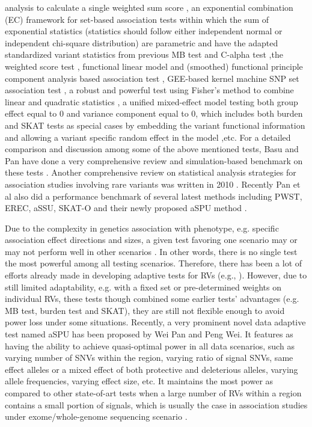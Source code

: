 \documentclass[12pt]{article}
\begin{document}
analysis to calculate a single weighted sum score \cite{Zhang2011}, an exponential combination (EC) framework for set-based association tests within which the sum of exponential statistics (statistics should follow either independent normal or independent chi-square distribution) are parametric and have the adapted standardized variant statistics from previous MB test and C-alpha test \cite{Chen2012},the weighted score test \cite{Cai2012}, functional linear model and (smoothed) functional principle component analysis based association test \cite{Luo2011,Luo2012, Luo2012a,Fan2013}, GEE-based kernel machine SNP set association test \cite{Wang2013}, a robust and powerful test using Fisher's method to combine linear and quadratic statistics \cite{Derkach2013}, a unified mixed-effect model testing both group effect equal to 0 and variance component equal to 0, which includes both burden and SKAT tests as special cases by embedding the variant functional information and allowing a variant specific random effect in the model \cite{Sun2013},etc. For a detailed comparison and discussion among some of the above mentioned tests, Basu and Pan have done a very comprehensive review and simulation-based benchmark on these tests \cite{Basu2011}. Another comprehensive review on statistical analysis strategies for association studies involving rare variants was written in 2010 \cite{Bansal2010}. Recently Pan et al also did a performance benchmark of several latest methods including PWST, EREC, aSSU, SKAT-O and their newly proposed aSPU method \cite{pan2014powerful}.

Due to the complexity in genetics association with phenotype, e.g. specific association effect directions and sizes, a given test favoring one scenario may or may not perform well in other scenarios \cite{Pan2009,Derkach2013,pan2014powerful,Sun2013}. In other words, there is no single test the most powerful among all testing scenarios. Therefore, there has been a lot of efforts already made in developing adaptive tests for RVs (e.g., \cite{Derkach2013,Chen2012,Han2010,Lee2012,Lin2011,Pan2011,Sun2013,Zhang2011}). However, due to still limited adaptability, e.g. with a fixed set or pre-determined weights on individual RVs, these tests though combined some earlier tests' advantages (e.g. MB test, burden test and SKAT), they are still not flexible enough to avoid power loss under some situations. Recently, a very prominent novel data adaptive test named aSPU has been proposed by Wei Pan and Peng Wei\cite{pan2014powerful}. It features as having the ability to achieve quasi-optimal power in all data scenarios, such as varying number of SNVs within the region, varying ratio of signal SNVs, same effect alleles or a mixed effect of both protective and deleterious alleles, varying allele frequencies, varying effect size, etc. It maintains the most power as compared to other state-of-art tests when a large number of RVs within a region contains a small portion of signals, which is usually the case in association studies under exome/whole-genome sequencing scenario \cite{pan2014powerful}.
\end{document}
